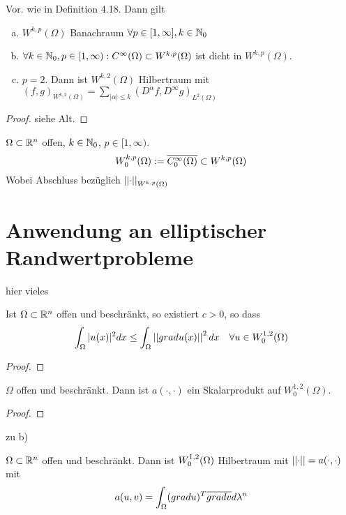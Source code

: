 	\begin{thm}
		Vor. wie in Definition 4.18. Dann gilt 
			\begin{enumerate}[a)]
				\item $W^{k,p}(\Omega)$ Banachraum $\forall p\in[1,\infty], k\in \mathbb{N}_0$
				\item $\forall k\in \mathbb{N}_0, p\in [1,\infty): C^\infty(\Omega) \subset W^{k,p}(\Omega)$ ist dicht in $W^{k,p}(\Omega)$.
				\item $p =2$. Dann ist $W^{k,2}(\Omega)$ Hilbertraum mit $(f,g)_{W^{k,2}(\Omega)} = \sum_{|\alpha| \leq k} (D^\alpha f, D^\infty g)_{L^2(\Omega)}$
			\end{enumerate}
	\end{thm}

	\begin{proof}
		siehe Alt.
	\end{proof}

	\begin{definition}[$W^{k,p}_0(\Omega)$]
		$\Omega \subset \mathbb{R}^n$ offen, $k\in \mathbb{N}_0$, $p\in [1,\infty)$.
			$$ W^{k,p}_0(\Omega) := \overline{C^\infty_0(\Omega)}\subset W^{k,p}(\Omega)$$ 
			Wobei Abschluss bezüglich $\left\lvert \left\lvert \cdot \right\rvert \right\rvert_{W^{k,p}(\Omega)}$
	\end{definition}
	\section*{Anwendung an elliptischer Randwertprobleme}
	 hier vieles 
	\begin{lemma}
		Ist $\Omega \subset \mathbb{R}^n$ offen und beschränkt, so existiert $c > 0$, so dass
			$$ \int_\Omega |u(x)|^2 dx \leq \int_\Omega \left\lvert \left\lvert grad u(x) \right\rvert \right\rvert^2dx \quad \forall u\in W_0^{1,2}(\Omega)$$
	\end{lemma}
	
	\begin{proof}
		\todor
	\end{proof}

	\begin{thm}
		$\Omega$ offen und beschränkt. Dann ist $a(\cdot,\cdot)$ ein Skalarprodukt auf $W_0^{1,2}(\Omega).$
	\end{thm}

	\begin{proof}
	\todor
	\end{proof}
zu b)
	\begin{thm}
		$\Omega \subset \mathbb{R}^n$ offen und beschränkt. Dann ist $W^{1,2}_0(\Omega)$ Hilbertraum mit $\left\lvert \left\lvert \cdot \right\rvert \right\rvert = a(\cdot,\cdot)$ mit 
		$$a(u,v) = \int_\Omega(grad u)^T \overline{grad v} d\lambda^n$$
	\end{thm}

